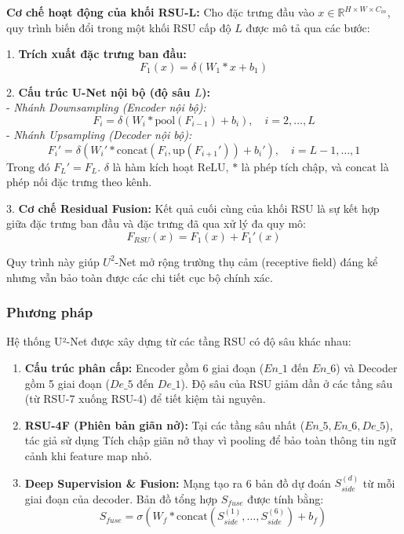 \textbf{Cơ chế hoạt động của khối RSU-L:}
Cho đặc trưng đầu vào $x \in \mathbb{R}^{H \times W \times C_{in}}$, quy trình biến đổi trong một khối RSU cấp độ $L$ được mô tả qua các bước:

1. \textbf{Trích xuất đặc trưng ban đầu:}
\begin{equation}
F_1(x) = \delta(W_1 * x + b_1)
\end{equation}

2. \textbf{Cấu trúc U-Net nội bộ (độ sâu $L$):}\\
- \textit{Nhánh Downsampling (Encoder nội bộ):}
\begin{equation}
F_i = \delta(W_i * \text{pool}(F_{i-1}) + b_i), \quad i=2, \dots, L
\end{equation}
- \textit{Nhánh Upsampling (Decoder nội bộ):}
\begin{equation}
F_i' = \delta(W_i' * \text{concat}(F_i, \text{up}(F_{i+1}')) + b_i'), \quad i=L-1, \dots, 1
\end{equation}
Trong đó $F_L' = F_L$. $\delta$ là hàm kích hoạt ReLU, $*$ là phép tích chập, và $\text{concat}$ là phép nối đặc trưng theo kênh.

3. \textbf{Cơ chế Residual Fusion:}
Kết quả cuối cùng của khối RSU là sự kết hợp giữa đặc trưng ban đầu và đặc trưng đã qua xử lý đa quy mô:
\begin{equation}
F_{RSU}(x) = F_1(x) + F_1'(x)
\end{equation}

Quy trình này giúp $U^2$-Net mở rộng trường thụ cảm (receptive field) đáng kể nhưng vẫn bảo toàn được các chi tiết cục bộ chính xác.

\subsubsection{Phương pháp}
\noindent Hệ thống U²-Net được xây dựng từ các tầng RSU có độ sâu khác nhau:
\begin{enumerate}
    \item \textbf{Cấu trúc phân cấp:} Encoder gồm 6 giai đoạn ($En\_1$ đến $En\_6$) và Decoder gồm 5 giai đoạn ($De\_5$ đến $De\_1$). Độ sâu của RSU giảm dần ở các tầng sâu (từ RSU-7 xuống RSU-4) để tiết kiệm tài nguyên.
    \item \textbf{RSU-4F (Phiên bản giãn nở):} Tại các tầng sâu nhất ($En\_5, En\_6, De\_5$), tác giả sử dụng Tích chập giãn nở thay vì pooling để bảo toàn thông tin ngữ cảnh khi feature map nhỏ.
    \item \textbf{Deep Supervision \& Fusion:} Mạng tạo ra 6 bản đồ dự đoán $S_{side}^{(d)}$ từ mỗi giai đoạn của decoder. Bản đồ tổng hợp $S_{fuse}$ được tính bằng:
    \begin{equation}
    S_{fuse} = \sigma(W_{f} * \text{concat}(S_{side}^{(1)}, \dots, S_{side}^{(6)}) + b_f)
    \end{equation}
\end{enumerate}

